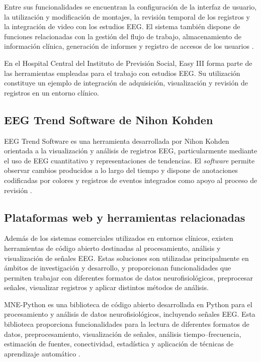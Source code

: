 Entre sus funcionalidades se encuentran la configuración de la interfaz de
usuario, la utilización y modificación de montajes, la revisión temporal de
los registros y la integración de video con los estudios EEG. El sistema
también dispone de funciones relacionadas con la gestión del flujo de trabajo,
almacenamiento de información clínica, generación de informes y registro de
accesos de los usuarios \citep{CadwellEasyIII}.

En el Hospital Central del Instituto de Previsión Social, Easy III
forma parte de las herramientas empleadas para el trabajo con estudios EEG.
Su utilización constituye un ejemplo de integración de adquisición,
visualización y revisión de registros en un entorno clínico.

\subsection{EEG Trend Software de Nihon Kohden}
\label{subsec:eeg-trend-nihon-kohden}

EEG Trend Software es una herramienta desarrollada por Nihon Kohden orientada
a la visualización y análisis de registros EEG, particularmente mediante el
uso de EEG cuantitativo y representaciones de tendencias. El \textit{software} permite observar cambios producidos a lo largo del tiempo y dispone de anotaciones
codificadas por colores y registros de eventos integrados como apoyo al
proceso de revisión \citep{NihonKohdenEEGTrend}.

\subsection{Plataformas web y herramientas relacionadas}
\label{subsec:plataformas-herramientas-eeg}

Además de los sistemas comerciales utilizados en entornos clínicos, existen
herramientas de código abierto destinadas al procesamiento, análisis y
visualización de señales EEG. Estas soluciones son utilizadas principalmente
en ámbitos de investigación y desarrollo, y proporcionan funcionalidades que
permiten trabajar con diferentes formatos de datos neurofisiológicos,
preprocesar señales, visualizar registros y aplicar distintos métodos de
análisis.

MNE-Python es una biblioteca de código abierto desarrollada en Python para el
procesamiento y análisis de datos neurofisiológicos, incluyendo señales EEG.
Esta biblioteca proporciona funcionalidades para la lectura de diferentes
formatos de datos, preprocesamiento, visualización de señales, análisis
tiempo--frecuencia, estimación de fuentes, conectividad, estadística y
aplicación de técnicas de aprendizaje automático
\citep{Gramfort2013MNE}.

